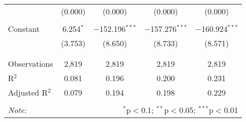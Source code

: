 \begin{table}[!htbp]
\begin{tabular}{@{\extracolsep{-5pt}}lcccc}
  & (0.000) & (0.000) & (0.000) & (0.000) \\ 
  & & & & \\ 
 Constant & 6.254$^{*}$ & $-$152.196$^{***}$ & $-$157.276$^{***}$ & $-$160.924$^{***}$ \\ 
  & (3.753) & (8.650) & (8.733) & (8.571) \\ 
  & & & & \\ 
\hline \\[-1.8ex] 
Observations & 2,819 & 2,819 & 2,819 & 2,819 \\ 
R$^{2}$ & 0.081 & 0.196 & 0.200 & 0.231 \\ 
Adjusted R$^{2}$ & 0.079 & 0.194 & 0.198 & 0.229 \\ 
\hline 
\hline \\[-1.8ex] 
\textit{Note:}  & \multicolumn{4}{r}{$^{*}$p$<$0.1; $^{**}$p$<$0.05; $^{***}$p$<$0.01} \\ 
\end{tabular} 
\end{table} 

